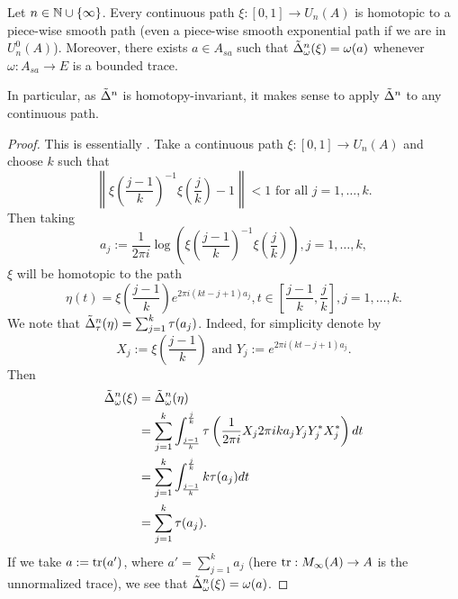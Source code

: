 \documentclass[12pt]{amsart}
\begin{document}
      \begin{prop}\label{rem:cts-to-piece-wise-smooth}\mbox{}
Let $n \in \mathbb{N} \cup \{\infty\}$. Every continuous path $\xi: [0,1] \to U_n(A)$ is homotopic to a piece-wise smooth path {\normalfont (}even a piece-wise smooth exponential path if we are in $U_n^0(A)${\normalfont )}. Moreover, there exists $a \in A_{sa}$ such that $\tilde{\Delta}_\omega^n(\xi) = \omega(a)$ whenever $\omega: A_{sa} \to E$ is a bounded trace.

In particular, as $\tilde{\Delta}^n$ is homotopy-invariant, it makes sense to apply $\tilde{\Delta}^n$ to any continuous path. 
\begin{proof}
This is essentially \cite[Lemme 3]{dlHS84a}. Take a continuous path $\xi: [0,1] \to U_n(A)$ and choose $k$ such that
    \begin{equation}
    \left\|\xi(\frac{j-1}{k})^{-1}\xi(\frac{j}{k}) - 1\right\| < 1 \text{ for all } j=1,\dots,k.
    \end{equation}
    Then taking
    \begin{equation}
    a_j := \frac{1}{2\pi i}\log \left(\xi(\frac{j-1}{k})^{-1}\xi(\frac{j}{k})\right), j=1,\dots,k,
    \end{equation}
     $\xi$ will be homotopic to the path
    \begin{equation}
    \eta(t) = \xi\left(\frac{j-1}{k}\right)e^{2\pi i(kt - j+1)a_j}, t \in \left[\frac{j-1}{k},\frac{j}{k}\right], j=1,\dots,k.
    \end{equation}
            We note that $\tilde{\Delta}_\tau^n(\eta) = \sum_{j=1}^k \tau(a_j)$. Indeed, for simplicity denote by 
 \begin{equation}
 X_j := \xi\left(\frac{j-1}{k}\right)\text{ and }Y_j := e^{2\pi i(kt - j + 1)a_j}. 
 \end{equation}
 Then
\begin{equation}\label{eq:xi-to-eta-ajs}
\begin{split}
 \tilde{\Delta}_\omega^n(\xi) &=  \tilde{\Delta}_\omega^n(\eta) \\
 &=\sum_{j=1}^k \int_{\frac{j-1}{k}}^{\frac{j}{k}}\tau\left(\frac{1}{2\pi i}X_j 2\pi i k a_jY_jY_j^*X_j^*\right) dt \\
 &= \sum_{j=1}^k \int_{\frac{j-1}{k}}^{\frac{j}{k}}k\tau(a_j) dt \\
 &= \sum_{j=1}^k \tau(a_j). \\
 \end{split}
\end{equation}
If we take $a := \text{tr}(a')$, where $a' = \sum_{j=1}^k a_j$ (here $\text{tr}: M_{\infty}(A) \to A$ is the unnormalized trace), we see that $\tilde{\Delta}_\omega^n(\xi) = \omega(a)$.
 \end{proof}
    \end{prop}
  
\end{document}
